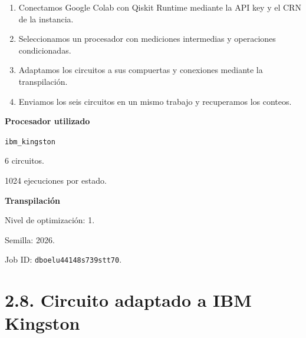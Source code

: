\documentclass{afitdefense}
\begin{document}
\begin{Center}

\begin{minipage}[c]{0.58\textwidth}
\small

\begin{enumerate}
    \item Conectamos Google Colab con
    Qiskit Runtime mediante la API key
    y el CRN de la instancia.

    \item Seleccionamos un procesador
    con mediciones intermedias y
    operaciones condicionadas.

    \item Adaptamos los circuitos a sus
    compuertas y conexiones mediante
    la transpilación.

    \item Enviamos los seis circuitos
    en un mismo trabajo y recuperamos
    los conteos.
\end{enumerate}

\end{minipage}
\hfill
\begin{minipage}[c]{0.38\textwidth}
\small
\centering

\textbf{Procesador utilizado}

\medskip

\texttt{ibm\_kingston}

\medskip

6 circuitos.

\medskip

1024 ejecuciones por estado.

\medskip

\textbf{Transpilación}

Nivel de optimización: 1.

Semilla: 2026.

\end{minipage}

\medskip

{\scriptsize
Job ID: \texttt{dboelu44148s739stt70}.

}

\end{Center}


\section{2.8. Circuito adaptado a IBM Kingston}
\end{document}
